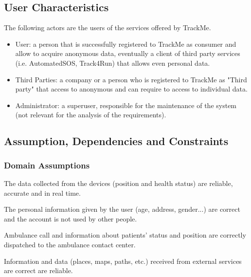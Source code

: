 \documentclass[a4paper]{article}
\begin{document}
\subsection{User Characteristics}
The following actors are the users of the services offered by TrackMe. 


\begin{itemize}
    \item User:  a person that is successfully registered to TrackMe as consumer and allow to acquire anonymous data, eventually a client of third party services (i.e. AutomatedSOS, Track4Run) that allows even personal data.
    \item Third Parties:  a company or a person who is registered to TrackMe as "Third party" that access to anonymous and can require to access to individual data.
    \item Administrator: a superuser, responsible for the maintenance of the system (not relevant for the analysis of the requirements).
\end{itemize}

\vspace{2cm}

\subsection{Assumption, Dependencies and Constraints}

\subsubsection{Domain Assumptions}

\begin{enumerate}[label={[D.\arabic*]}]
    
    \item The data collected from the devices (position and health status) are reliable, accurate and in real time.
    \item The personal information given by the user (age, address, gender...) are correct and the account is not used by other people. 
    \item Ambulance call and information about patients' status and position are correctly dispatched to the ambulance contact center.
    \item Information and data (places, maps, paths, etc.) received from external services are correct are reliable.
    
\end{enumerate}
\clearpage
\end{document}
